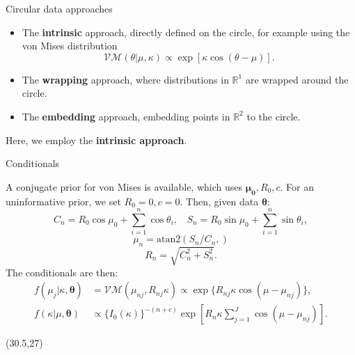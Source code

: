 \documentclass[final]{beamer}
\begin{document}
\begin{frame}
\begin{textblock}{26.5}
\vspace{\TPHorizModule}

\begin{block}{Circular data approaches}
\begin{itemize}
\item The \textbf{intrinsic} approach, directly defined on the circle, for example using the von Mises distribution
$$ \mathcal{VM}(\theta \vert \mu, \kappa) \propto \exp\left[ \kappa \cos (\theta - \mu) \right].$$
\item The \textbf{wrapping} approach, where distributions in $\mathbb{R}^1$ are wrapped around the circle. 
\item The \textbf{embedding} approach, embedding points in $\mathbb{R}^2$ to the circle.
\end{itemize}

Here, we employ the \textbf{intrinsic approach}.

\end{block}



\vspace{\TPHorizModule}
\begin{block}{Conditionals}
\begin{small}
A conjugate prior for von Mises is available, which uses $\boldsymbol{\mu_{0}}, R_0, c$. For an uninformative prior, we set $R_0 = 0, c = 0$. Then, given data $\boldsymbol{\theta}$:
$$ C_n = R_0 \cos \mu_0 + \sum_{i=1}^n \cos \theta_i, ~~~~ S_n = R_0 \sin \mu_0 + \sum_{i=1}^n \sin \theta_i,$$
$$  \mu_n = \text{atan2}(S_n/C_n,) $$
$$ R_n = \sqrt{C_n^2 + S_n^2}.$$
The conditionals are then:
\begin{align*}
f(\mu_j \vert \kappa, \boldsymbol\theta) & = \mathcal{VM}(\mu_{nj}, R_{nj} \kappa) \propto \exp\{R_{nj} \kappa \cos(\mu - \mu_{nj})\},\\
f(\kappa \vert \mu, \boldsymbol\theta) &\propto \{ I_0(\kappa) \} ^{-(n+c)} \exp\left[  R_n \kappa \sum_{j=1}^{J}\cos(\mu - \mu_{nj}) \right]. 
\end{align*}
\end{small}
\end{block}


\end{textblock}
%
%
\begin{textblock}{26.5}(30.5,27)
\vspace{\TPHorizModule}


\end{textblock}
\end{frame}
\end{document}
